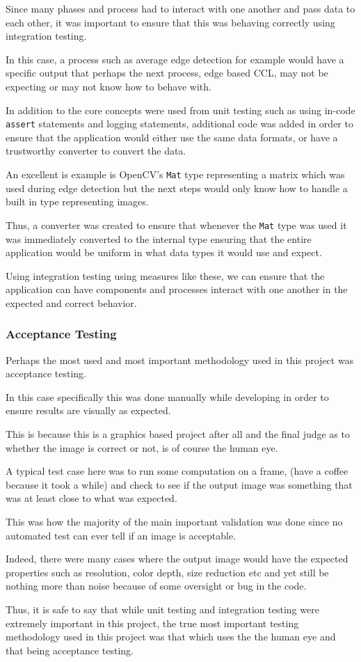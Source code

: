 \documentclass[12pt]{article}
\newcommand{\sentence}{} %
\newcommand{\code}[1]{\texttt{#1}}
\begin{document}
    \tab
    Since many phases and process had to interact with one another and pass data to each other, it was important to
    ensure that this was behaving correctly using integration testing.
    \sentence
    In this case, a process such as average edge detection for example would have a specific output that perhaps the
    next process, edge based CCL, may not be expecting or may not know how to behave with.
    \sentence
    In addition to the core concepts were used from unit testing such as using in-code \code{assert} statements
    and logging statements, additional code was added in order to ensure that the application would either use the
    same data formats, or have a trustworthy converter to convert the data.
    \sentence
    An excellent is example is OpenCV's \code{Mat} type representing a matrix which was used during edge detection
    but the next steps would only know how to handle a built in type representing images.
    \sentence
    Thus, a converter was created to ensure that whenever the \code{Mat} type was used it was immediately converted
    to the internal type ensuring that the entire application would be uniform in what data types it would use and
    expect.
    \sentence
    Using integration testing using measures like these, we can ensure that the application can have components and
    processes interact with one another in the expected and correct behavior.

    \subsubsection{Acceptance Testing}\label{subsubsec:acceptance-testing}

    \tab
    Perhaps the most used and most important methodology used in this project was acceptance testing.
    \sentence
    In this case specifically this was done manually while developing in order to ensure results are visually as
    expected.
    \sentence
    This is because this is a graphics based project after all and the final judge as to whether the image is correct
    or not, is of course the human eye.
    \sentence
    A typical test case here was to run some computation on a frame, (have a coffee because it took a while) and
    check to see if the output image was something that was at least close to what was expected.
    \sentence
    This was how the majority of the main important validation was done since no automated test can ever tell if an
    image is acceptable.
    \sentence
    Indeed, there were many cases where the output image would have the expected properties such as resolution, color
    depth, size reduction etc and yet still be nothing more than noise because of some oversight or bug in the code.
    \sentence
    Thus, it is safe to say that while unit testing and integration testing were extremely important in this project,
    the true most important testing methodology used in this project was that which uses the the human eye and that
    being acceptance testing.
\end{document}
